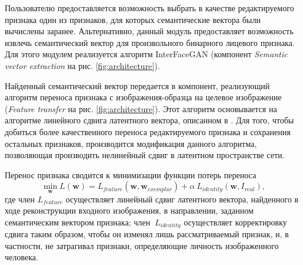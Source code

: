 Пользователю предоставляется возможность выбрать в качестве редактируемого признака один из признаков, для которых семантические вектора были вычислены заранее.
Альтернативно, данный модуль предоставляет возможность извлечь семантический вектор для произвольного бинарного лицевого признака.
Для этого модулем реализуется алгоритм InterFaceGAN (компонент \emph{Semantic vector extraction} на рис. \ref{fig:architecture}).

Найденный семантический вектор передается в компонент, реализующий алгоритм переноса признака с изображения-образца на целевое изображение (\emph{Feature transfer} на рис. \ref{fig:architecture}).
Этот алгоритм основывается на алгоритме линейного сдвига латентного вектора, описанном в \cite{abdal2019image2stylegan}.
Для того, чтобы добиться более качественного переноса редактируемого признака и сохранения остальных признаков, производится модификация данного алгоритма, позволяющая производить нелинейный сдвиг в латентном пространстве сети.

Перенос признака сводится к минимизации функции потерь переноса
$$ 
\min_{\mathbf w} L(\mathbf w) = L_{feature}(\mathbf w, \mathbf w_{exemplar}) + \alpha~L_{identity}(\mathbf w, I_{real}),
$$
где член $L_{feature}$ осуществляет линейный сдвиг латентного вектора, найденного в ходе реконструкции входного изображения, в направлении, заданном семантическим вектором признака;  член $~L_{identity}$ осуществляет корректировку сдвига таким образом, чтобы он изменял лишь рассматриваемый признак, и, в частности, не затрагивал признаки, определяющие личность изображенного человека.
